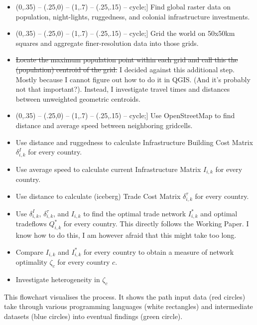 \documentclass[11pt, oneside]{article}   	%
\def\checkmark{\tikz\fill[scale=0.4](0,.35) -- (.25,0) -- (1,.7) -- (.25,.15) -- cycle;}
\begin{document}
\begin{itemize}
  \item[\checkmark] Find global raster data on population, night-lights, ruggedness, and colonial infrastructure investments.
  \item[\checkmark] Grid the world on 50x50km squares and aggregate finer-resolution data into those grids.
  \item \st{Locate the maximum population point within each grid and call this the (population) centroid of the grid.} I decided against this additional step. Mostly because I cannot figure out how to do it in QGIS. (And it's probably not that important?). Instead, I investigate travel times and distances between unweighted geometric centroids.
  \item[\checkmark] Use OpenStreetMap to find distance and average speed between neighboring gridcells.
  \item Use distance and ruggedness to calculate Infrastructure Building Cost Matrix $\delta^{I}_{i,k}$ for every country.
  \item Use average speed to calculate current Infrastructure Matrix $I_{i,k}$ for every country.
  \item Use distance to calculate (iceberg) Trade Cost Matrix $\delta^{\tau}_{i,k}$ for every country.
  \item Use $\delta^{I}_{i,k}$, $\delta^{\tau}_{i,k}$, and $I_{i,k}$ to find the optimal trade network $I^{*}_{i,k}$ and optimal tradeflows $Q^{*}_{i,k}$ for every country. This directly follows the \cite{fajgelbaum_optimal_2017} Working Paper. I know how to do this, I am however afraid that this might take too long.
  \item Compare $I_{i,k}$ and $I^{*}_{i,k}$ for every country to obtain a measure of network optimality $\zeta_{c}$ for every country $c$.
  \item Investigate heterogeneity in $\zeta_{c}$

\end{itemize}

This flowchart visualises the process. It shows the path input data (red circles) take through various programming languages (white rectangles) and intermediate datasets (blue circles) into eventual findings (green circle).
\end{document}
